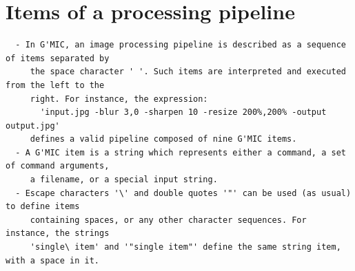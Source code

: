 \documentclass[a4paper,11pt,twoside]{book}
\begin{document}
\section{Items of a processing pipeline}
\small
\begin{lstlisting}
  - In G'MIC, an image processing pipeline is described as a sequence of items separated by 
     the space character ' '. Such items are interpreted and executed from the left to the 
     right. For instance, the expression: 
       'input.jpg -blur 3,0 -sharpen 10 -resize 200%,200% -output output.jpg' 
     defines a valid pipeline composed of nine G'MIC items. 
  - A G'MIC item is a string which represents either a command, a set of command arguments, 
     a filename, or a special input string. 
  - Escape characters '\' and double quotes '"' can be used (as usual) to define items 
     containing spaces, or any other character sequences. For instance, the strings 
     'single\ item' and '"single item"' define the same string item, with a space in it.
\end{lstlisting}
\normalsize
\end{document}

